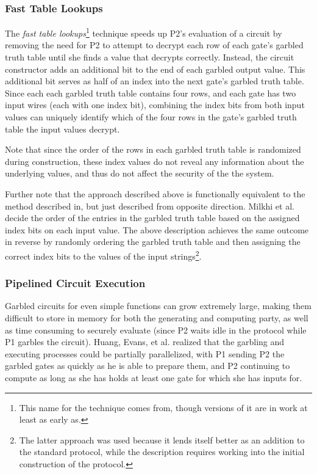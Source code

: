 \subsubsection{Fast Table Lookups}

The \emph{fast table lookups}\footnote{This name for the technique comes from\cite{huang2011faster}, though versions of it are in work at least as early as\cite{malkhi2004fairplay}.} technique speeds up \ac{P2}'s evaluation of a circuit by removing the need for \ac{P2} to attempt to decrypt each row of each gate's garbled truth table until she finds a value that decrypts correctly.  Instead, the circuit constructor adds an additional bit to the end of each garbled output value. This additional bit serves as half of an index into the next gate's garbled truth table. Since each each garbled truth table contains four rows, and each gate has two input wires (each with one index bit), combining the index bits from both input values can uniquely identify which of the four rows in the gate's garbled truth table the input values decrypt.

Note that since the order of the rows in each garbled truth table is randomized during construction, these index values do not reveal any information about the underlying values, and thus do not affect the security of the the system.

Further note that the approach described above is functionally equivalent to the method described in\cite{malkhi2004fairplay}, but just described from opposite direction.  Milkhi et al. decide the order of the entries in the garbled truth table based on the assigned index bits on each input value.  The above description achieves the same outcome in reverse by randomly ordering the garbled truth table and then assigning the correct index bits to the values of the input strings\footnote{The latter approach was used because it lends itself better as an addition to the standard protocol, while the \cite{malkhi2004fairplay} description requires working into the initial construction of the protocol.}.

\subsubsection{Pipelined Circuit Execution}
\label{sec:piplinedexecution}

Garbled circuits for even simple functions can grow extremely large, making them difficult to store in memory for both the generating and computing party, as well as time consuming to securely evaluate (since \ac{P2} waits idle in the protocol while \ac{P1} garbles the circuit).  Huang, Evans, et al.\cite{huang2011faster} realized that the garbling and executing processes could be partially parallelized, with \ac{P1} sending \ac{P2} the garbled gates as quickly as he is able to prepare them, and \ac{P2} continuing to compute as long as she has holds at least one gate for which she has inputs for.

